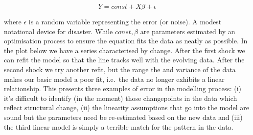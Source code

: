 \documentclass[]{tufte-book}
\theoremstyle{definition}
\theoremstyle{definition}
\theoremstyle{definition}
\theoremstyle{remark}
\begin{document}
\[ Y = const + X\beta + \epsilon  \]

where \(\epsilon\) is a random variable representing the error (or noise). A modest notational device for disaster. While \(const, \beta\) are parameters estimated by an optimisation process to ensure the equation fits the data as neatly as possible. In the plot below we have a series characterised by change. After the first shock we can refit the model so that the line tracks well with the evolving data. After the second shock we try another refit, but the range the and variance of the data makes our basic model a poor fit, i.e.~the data no longer exhibits a linear relationship. This presents three examples of error in the modelling process: (i) it's difficult to identify (in the moment) those changepoints in the data which reflect structural change, (ii) the linearity assumptions that go into the model are sound but the parameters need be re-estimated based on the new data and (iii) the third linear model is simply a terrible match for the pattern in the data.
\end{document}
